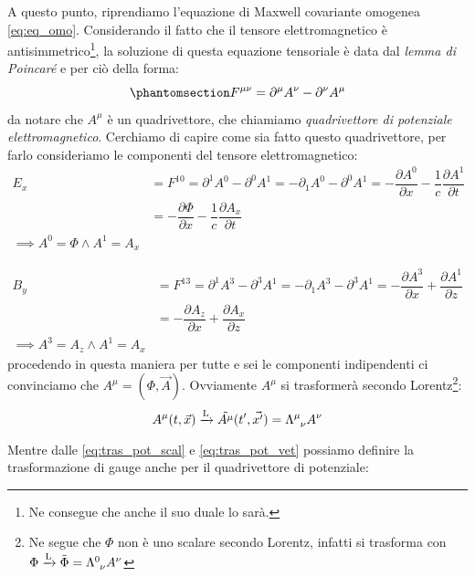 A questo punto, riprendiamo l'equazione di Maxwell covariante omogenea \eqref{eq:eq_omo}. Considerando il fatto che il tensore elettromagnetico è antisimmetrico\footnote{Ne consegue che anche il suo duale lo sarà.}, la soluzione di questa equazione tensoriale è data dal \textit{lemma di Poincaré} e per ciò della forma:
\begin{equation}\phantomsection\label{eq:sol_omo}
   F\indices{^{\mu \nu}}=\partial^\mu A^\nu -\partial^\nu A^\mu
\end{equation}
da notare che $A^\mu$ è un quadrivettore, che chiamiamo \textit{quadrivettore di potenziale elettromagnetico}. Cerchiamo di capire come sia fatto questo quadrivettore, per farlo consideriamo le componenti del tensore elettromagnetico:
\begin{equation*}
\begin{split}
     E_x&=F^{10}=\partial^1 A^0 -\partial^0 A^1=-\partial_1 A^0 -\partial^0 A^1=-\dfrac{\partial A^0}{\partial x}-\dfrac{1}{c}\dfrac{\partial A^1}{\partial t}\\
      &=-\dfrac{\partial \Phi}{\partial x}-\dfrac{1}{c}\dfrac{\partial A_x}{\partial t}\\
      \implies A^0=\Phi \land  A^1=A_x
\end{split}
\end{equation*}

\begin{equation*}
\begin{split}
     B_y&=F^{13}=\partial^1 A^3 -\partial^3 A^1=-\partial_1 A^3 -\partial^3 A^1=-\dfrac{\partial A^3}{\partial x}+\dfrac{\partial A^1}{\partial z}\\
      &=-\dfrac{\partial A_z}{\partial x}+\dfrac{\partial A_x}{\partial z}\\
      \implies A^3=A_z \land  A^1=A_x
\end{split}
\end{equation*}
procedendo in questa maniera per tutte e sei le componenti indipendenti ci convinciamo che $A^\mu=(\Phi,\Vec{A})$. Ovviamente $A^\mu$ si trasformerà secondo Lorentz\footnote{Ne segue che $\Phi$ non è uno scalare secondo Lorentz, infatti si trasforma con $\Phi
   \xrightarrow[\text{}]{\text{L}}
  \Tilde{\Phi}= \Lambda\indices{^0_\nu}A^\nu$}:
\begin{equation}
   A^\mu(t,\Vec{x})
   \xrightarrow[\text{}]{\text{L}}
  \Tilde{A^\mu}(t',\Vec{x'})= \Lambda\indices{^\mu_\nu}A^\nu
\end{equation}
Mentre dalle \eqref{eq:tras_pot_scal} e \eqref{eq:tras_pot_vet} possiamo definire la trasformazione di gauge anche per il quadrivettore di potenziale:


